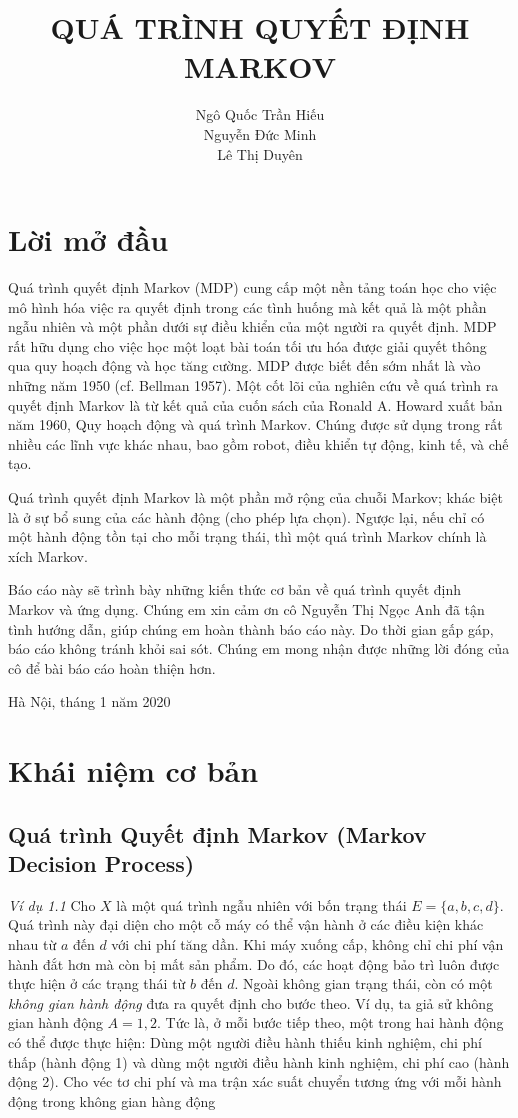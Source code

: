 \documentclass[12pt,a4paper]{report}
\author{Ngô Quốc Trần Hiếu \\Nguyễn Đức Minh \\Lê Thị Duyên}
\title{ \textbf{QUÁ TRÌNH QUYẾT ĐỊNH MARKOV}}
\begin{document}
	\large
	\maketitle
	\chapter*{Lời mở đầu}
	\hspace{0.5cm}Quá trình quyết định Markov (MDP) cung cấp một nền tảng toán học cho việc mô hình hóa việc ra quyết định trong các tình huống mà kết quả là một phần ngẫu nhiên và một phần dưới sự điều khiển của một người ra quyết định. MDP rất hữu dụng cho việc học một loạt bài toán tối ưu hóa được giải quyết thông qua quy hoạch động và học tăng cường. MDP được biết đến sớm nhất là vào những năm 1950 (cf. Bellman 1957). Một cốt lõi của nghiên cứu về quá trình ra quyết định Markov là từ kết quả của cuốn sách của Ronald A. Howard xuất bản năm 1960, Quy hoạch động và quá trình Markov. Chúng được sử dụng trong rất nhiều các lĩnh vực khác nhau, bao gồm robot, điều khiển tự động, kinh tế, và chế tạo.
	
	Quá trình quyết định Markov là một phần mở rộng của chuỗi Markov; khác biệt là ở sự bổ sung của các hành động (cho phép lựa chọn). Ngược lại, nếu chỉ có một hành động tồn tại cho mỗi trạng thái, thì một quá trình Markov chính là xích Markov.
	
	Báo cáo này sẽ trình bày những kiến thức cơ bản về quá trình quyết định Markov và ứng dụng. Chúng em xin cảm ơn cô Nguyễn Thị Ngọc Anh đã tận tình hướng dẫn, giúp chúng em hoàn thành báo cáo này. Do thời gian gấp gáp, báo cáo không tránh khỏi sai sót. Chúng em mong nhận được những lời đóng của cô để bài báo cáo hoàn thiện hơn.
	
	\vfill
	\hfill Hà Nội, tháng 1 năm 2020
	
	\tableofcontents
	\chapter{Khái niệm cơ bản}
	 \section{Quá trình Quyết định Markov (Markov Decision Process)}


   
 	 \textit{Ví dụ 1.1} Cho $X$ là một quá trình ngẫu nhiên với bốn trạng thái $E=\{a,b,c,d\}$. Quá trình này đại diện cho một cỗ máy có thể vận hành ở các điều kiện khác nhau từ $a$ đến $d$ với chi phí tăng dần. Khi máy xuống cấp, không chỉ chi phí vận hành đắt hơn mà còn bị mất sản phẩm. Do đó, các hoạt động bảo trì luôn được thực hiện ở các trạng thái từ $b$ đến $d$. Ngoài không gian trạng thái, còn có một \textit{không gian hành động} đưa ra quyết định cho bước theo. Ví dụ, ta giả sử không gian hành động $A={1,2}$. Tức là, ở mỗi bước tiếp theo, một trong hai hành động có thể được thực hiện: Dùng một người điều hành thiếu kinh nghiệm, chi phí thấp (hành động 1) và dùng một người điều hành kinh nghiệm, chi phí cao (hành động 2). Cho véc tơ chi phí và ma trận xác suất chuyển tương ứng với mỗi hành động trong không gian hàng động
 	 
\end{document}
